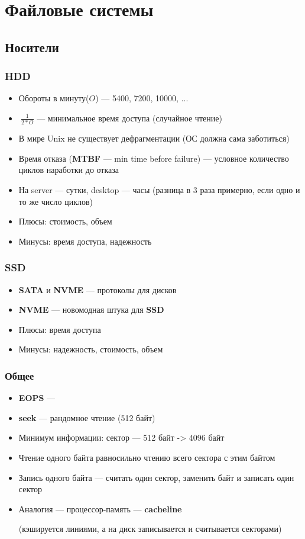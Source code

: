 \documentclass[../../lectures.tex]{subfiles}
\begin{document}
\chapter{Файловые системы}

\section{Носители}
\subsection{HDD}
\begin{itemize}
    \item Обороты в минуту($O$) --- 5400, 7200, 10000, ...
    \item $~\frac{1}{2 * O}$ --- минимальное время доступа (случайное чтение)
    \item В мире Unix не существует дефрагментации (ОС должна сама заботиться)
    \item Время отказа (\textbf{MTBF} --- min time before failure) --- условное 
          количество циклов наработки до отказа
    \item На server --- сутки, desktop --- часы (разница в 3 раза примерно, 
          если одно и то же число циклов)
    \item Плюсы: стоимость, объем
    \item Минусы: время доступа, надежность
\end{itemize}

\subsection{SSD}
\begin{itemize}
    \item \textbf{SATA} и \textbf{NVME} --- протоколы для дисков
    \item \textbf{NVME} --- новомодная штука для \textbf{SSD}
    \item Плюсы: время доступа
    \item Минусы: надежность, стоимость, объем
\end{itemize}

\subsection{Общее}
\begin{itemize}
    \item \textbf{EOPS} --- \todo{}
    \item \textbf{seek} --- рандомное чтение (512 байт)
    \item Минимум информации: сектор --- 512 байт -> 4096 байт
    \item Чтение одного байта равносильно чтению всего сектора с этим байтом
    \item Запись одного байта --- считать один сектор, заменить байт и записать один сектор
    \item Аналогия --- процессор-память --- \textbf{cacheline} 
        
         (кэшируется линиями, а на диск записывается и считывается секторами)
\end{itemize}
\end{document}
